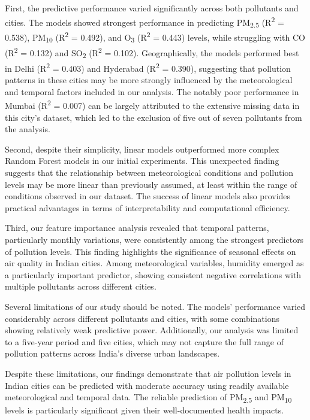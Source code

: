\documentclass[twoside,11pt]{article}
\begin{document}
First, the predictive performance varied significantly across both pollutants and cities. The models showed strongest performance in predicting PM\textsubscript{2.5} (R\textsuperscript{2} = 0.538), PM\textsubscript{10} (R\textsuperscript{2} = 0.492), and O\textsubscript{3} (R\textsuperscript{2} = 0.443) levels, while struggling with CO (R\textsuperscript{2} = 0.132) and SO\textsubscript{2} (R\textsuperscript{2} = 0.102). Geographically, the models performed best in Delhi (R\textsuperscript{2} = 0.403) and Hyderabad (R\textsuperscript{2} = 0.390), suggesting that pollution patterns in these cities may be more strongly influenced by the meteorological and temporal factors included in our analysis. The notably poor performance in Mumbai (R\textsuperscript{2} = 0.007) can be largely attributed to the extensive missing data in this city's dataset, which led to the exclusion of five out of seven pollutants from the analysis.

Second, despite their simplicity, linear models outperformed more complex Random Forest models in our initial experiments. This unexpected finding suggests that the relationship between meteorological conditions and pollution levels may be more linear than previously assumed, at least within the range of conditions observed in our dataset. The success of linear models also provides practical advantages in terms of interpretability and computational efficiency.

Third, our feature importance analysis revealed that temporal patterns, particularly monthly variations, were consistently among the strongest predictors of pollution levels. This finding highlights the significance of seasonal effects on air quality in Indian cities. Among meteorological variables, humidity emerged as a particularly important predictor, showing consistent negative correlations with multiple pollutants across different cities.

Several limitations of our study should be noted. The models' performance varied considerably across different pollutants and cities, with some combinations showing relatively weak predictive power. Additionally, our analysis was limited to a five-year period and five cities, which may not capture the full range of pollution patterns across India's diverse urban landscapes.

Despite these limitations, our findings demonstrate that air pollution levels in Indian cities can be predicted with moderate accuracy using readily available meteorological and temporal data. The reliable prediction of PM\textsubscript{2.5} and PM\textsubscript{10} levels is particularly significant given their well-documented health impacts.
\end{document}
